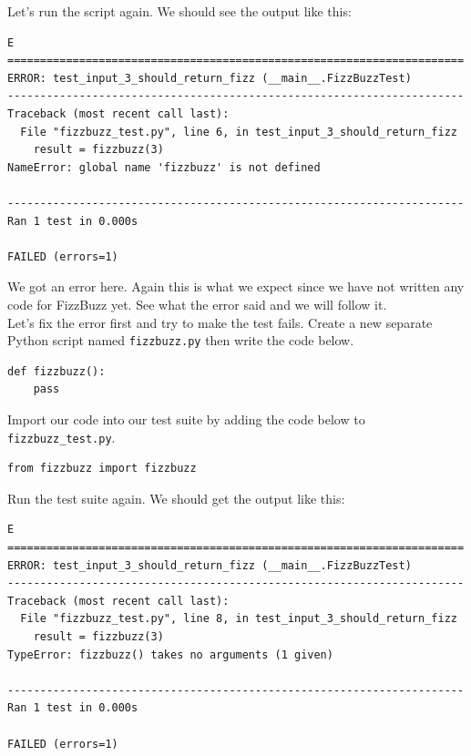 \documentclass{article}
\begin{document}
\noindent Let's run the script again. We should see the output like this:

\begin{verbatim}
E
======================================================================
ERROR: test_input_3_should_return_fizz (__main__.FizzBuzzTest)
----------------------------------------------------------------------
Traceback (most recent call last):
  File "fizzbuzz_test.py", line 6, in test_input_3_should_return_fizz
    result = fizzbuzz(3)
NameError: global name 'fizzbuzz' is not defined

----------------------------------------------------------------------
Ran 1 test in 0.000s

FAILED (errors=1)
\end{verbatim}

\noindent We got an error here. Again this is what we expect since we have not
written any code for FizzBuzz yet. See what the error said and we will follow
it. \\

\noindent Let's fix the error first and try to make the test fails. Create a
new separate Python script named {\tt fizzbuzz.py} then write the code below.

\begin{verbatim}
def fizzbuzz():
    pass
\end{verbatim}

\noindent Import our code into our test suite by adding the code below to {\tt
fizzbuzz\_test.py}.

\begin{verbatim}
from fizzbuzz import fizzbuzz
\end{verbatim}

\noindent Run the test suite again. We should get the output like this:

\begin{verbatim}
E
======================================================================
ERROR: test_input_3_should_return_fizz (__main__.FizzBuzzTest)
----------------------------------------------------------------------
Traceback (most recent call last):
  File "fizzbuzz_test.py", line 8, in test_input_3_should_return_fizz
    result = fizzbuzz(3)
TypeError: fizzbuzz() takes no arguments (1 given)

----------------------------------------------------------------------
Ran 1 test in 0.000s

FAILED (errors=1)
\end{verbatim}
\end{document}
